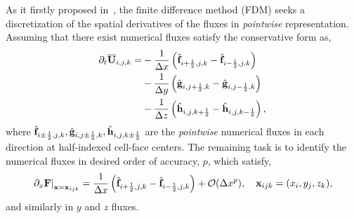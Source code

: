 As it firstly proposed in~\cite{shu1989efficient}, the finite difference method (FDM) seeks a discretization of
the spatial derivatives of the fluxes in \textit{pointwise} representation.
Assuming that there exist numerical fluxes satisfy the conservative form as,
\begin{equation}\label{eq:fdm_discrete}
    \begin{split}
        \partial_{t} \overline{\mathbf{U}}_{i,j,k} =& - \frac{1}{\Delta x} \left( \hat{\mathbf{f}}_{{i+\frac{1}{2}},j,k} - \hat{\mathbf{f}}_{{i-\frac{1}{2}},j,k} \right) \\
                                             & - \frac{1}{\Delta y} \left( \hat{\mathbf{g}}_{i,{j+\frac{1}{2}},k} - \hat{\mathbf{g}}_{i,{j-\frac{1}{2}},k} \right) \\
                                             & - \frac{1}{\Delta z} \left( \hat{\mathbf{h}}_{i,j,{k+\frac{1}{2}}} - \hat{\mathbf{h}}_{i,j,{k-\frac{1}{2}}} \right),
    \end{split}
\end{equation}
where \( \hat{\mathbf{f}}_{i \pm \frac{1}{2},j,k}, \hat{\mathbf{g}}_{i,j \pm \frac{1}{2},k}, \hat{\mathbf{h}}_{i,j,k \pm \frac{1}{2}} \)
are the \textit{pointwise} numerical fluxes in each direction at half-indexed cell-face centers.
The remaining task is to identify the numerical fluxes in desired order of accuracy, \( p \), which satisfy,
\begin{equation}\label{eq:fdm_flux_deriv}
    \left. \partial_{x} \mathbf{F} \right|_{\mathbf{x} = \mathbf{x}_{ijk}} =
    \frac{1}{\Delta x} \left( \hat{\mathbf{f}}_{{i+\frac{1}{2}},j,k} - \hat{\mathbf{f}}_{{i-\frac{1}{2}},j,k} \right) +
        \mathcal{O} (\Delta x^{p}), \quad
    \mathbf{x}_{ijk} = (x_i, y_j, z_k),
\end{equation}
and similarly in \( y \) and \( z \) fluxes.

